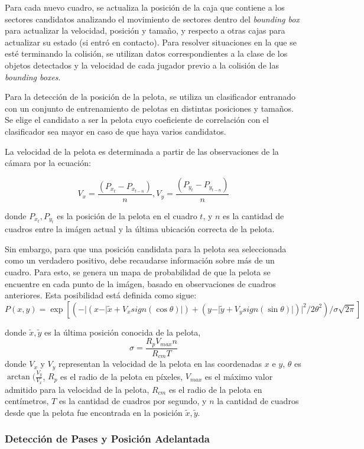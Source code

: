 \documentclass[a4paper,10pt]{article}
\begin{document}
Para cada nuevo cuadro, se actualiza la posición de la caja que contiene a
los sectores candidatos analizando el movimiento de sectores dentro del
\textit{bounding box} para actualizar la velocidad, posición y tamaño,
y respecto a otras cajas para actualizar su estado (si entró en contacto).
Para resolver situaciones en la que se esté terminando la colisión, se utilizan
datos correspondientes a la clase de los objetos detectados y la velocidad de
cada jugador previo a la colisión de las \textit{bounding boxes}.

Para la detección de la posición de la pelota, se utiliza un clasificador
entranado con un conjunto de entrenamiento de pelotas en distintas posiciones y
tamaños. Se elige el candidato a ser la pelota cuyo coeficiente de correlación
con el clasificador sea mayor en caso de que haya varios candidatos.

La velocidad de la pelota es determinada a partir de las observaciones de la
cámara por la ecuación:

\[
  V_x = \frac{(P_{x_t} - P_{x_{t-n}})}{n}, V_y = \frac{(P_{y_t} - P_{y_{t-n}})}{n}
\]

donde $P_{x_t}, P_{y_t}$ es la posición de la pelota en el cuadro $t$, y $n$ es
la cantidad de cuadros entre la imágen actual y la última ubicación correcta de
la pelota.

Sin embargo, para que una posición candidata para la pelota sea seleccionada
como un verdadero positivo, debe recaudarse información sobre más de un cuadro.
Para esto, se genera un mapa de probabilidad de que la pelota se encuentre en
cada punto de la imágen, basado en observaciones de cuadros anteriores. Esta
posibilidad está definida como sigue:
\[
  P(x, y) = \exp \left[ (- \vert ( x - \vert \tilde{x} + V_x sign(\cos \theta) \vert )
  + ( y - \vert \tilde{y} + V_y sign(\sin \theta) \vert)\vert ^ 2 / 2\theta^2) /\sigma \sqrt{2\pi} \right]
\]

donde $\tilde{x},\tilde{y}$ es la última posición conocida de la pelota,
\[
  \sigma = \frac{R_p V_{max} n}{R_{cm}T}
\]
donde $V_x$ y $V_y$ representan la velocidad de la pelota en las coordenadas
$x$ e $y$, $\theta$ es $\arctan(\tfrac{V_y}{V_x}$, $R_p$ es el radio de la pelota
en píxeles, $V_{max}$ es el máximo valor admitido para la velocidad de la
pelota, $R_{cm}$ es el radio de la pelota en centímetros, $T$ es la cantidad de
cuadros por segundo, y $n$ la cantidad de cuadros desde que la pelota fue
encontrada en la posición $\tilde{x},\tilde{y}$.

\subsubsection{Detección de Pases y Posición Adelantada}
\end{document}
